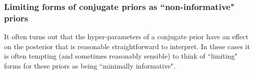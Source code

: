 \documentclass[12pt]{article}
\begin{document}

\subsubsection{Limiting forms of conjugate priors as ``non-informative" priors}

It often turns out that the hyper-parameters of a conjugate prior have an effect on the posterior
that is reasonable straightforward to interpret. In these cases it is often tempting (and sometimes
reasonably sensible) to think of ``limiting" forms for these priors as being ``minimally informative". 
\end{document}
